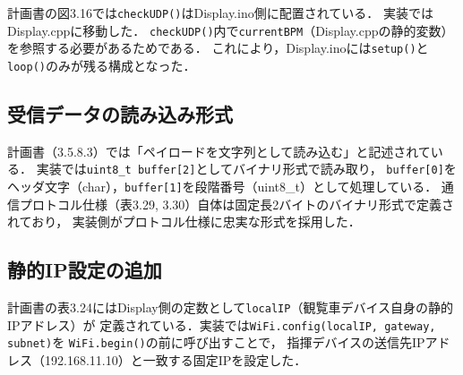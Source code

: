 \documentclass[uplatex,dvipdfmx,a4paper,11pt]{jsarticle}
\begin{document}
計画書の図3.16では\texttt{checkUDP()}はDisplay.ino側に配置されている．
実装ではDisplay.cppに移動した．
\texttt{checkUDP()}内で\texttt{currentBPM}（Display.cppの静的変数）を参照する必要があるためである．
これにより，Display.inoには\texttt{setup()}と\texttt{loop()}のみが残る構成となった．

\subsection{受信データの読み込み形式}

計画書（3.5.8.3）では「ペイロードを文字列として読み込む」と記述されている．
実装では\texttt{uint8\_t buffer[2]}としてバイナリ形式で読み取り，
\texttt{buffer[0]}をヘッダ文字（char），\texttt{buffer[1]}を段階番号（uint8\_t）として処理している．
通信プロトコル仕様（表3.29, 3.30）自体は固定長2バイトのバイナリ形式で定義されており，
実装側がプロトコル仕様に忠実な形式を採用した．

\subsection{静的IP設定の追加}

計画書の表3.24にはDisplay側の定数として\texttt{localIP}（観覧車デバイス自身の静的IPアドレス）が
定義されている．実装では\texttt{WiFi.config(localIP, gateway, subnet)}を
\texttt{WiFi.begin()}の前に呼び出すことで，
指揮デバイスの送信先IPアドレス（192.168.11.10）と一致する固定IPを設定した．
\end{document}
